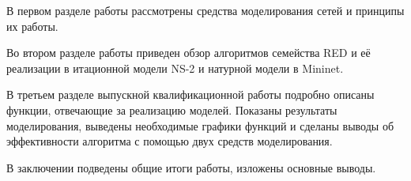 В первом разделе работы рассмотрены средства моделирования сетей и принципы их работы.

Во втором разделе работы приведен обзор алгоритмов семейства RED и её реализации в итационной модели NS-2 и натурной модели в Mininet.

В третьем разделе выпускной квалификационной работы подробно описаны функции, отвечающие за
реализацию моделей. Показаны результаты моделирования, выведены необходимые графики функций и 
сделаны выводы об эффективности алгоритма с помощью двух средств моделирования.

В заключении подведены общие итоги работы, изложены основные выводы.


